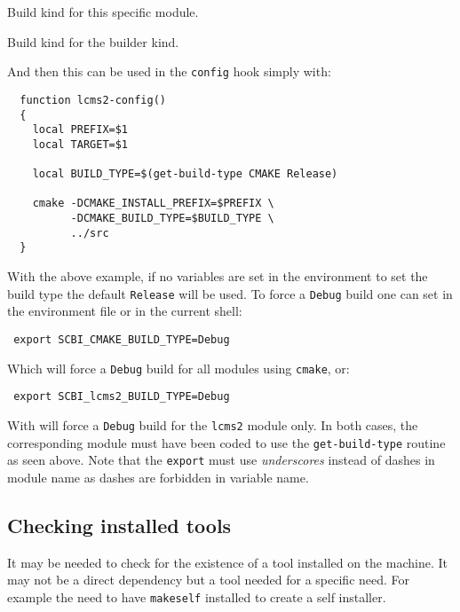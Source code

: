 \documentclass[a4paper,12pt,twoside]{article}
\newcommand{\code}[1]{\texttt{#1}}
\renewcommand{\emph}[1]{\textit{#1}}
\begin{document}
\begin{description}[style=nextline]
	\item [SCBI\_<module>\_BUILD\_TYPE] Build kind for this specific module.
	\item [SCBI\_<CONFIG>\_BUILD\_TYPE] Build kind for the builder kind.
\end{description}

And then this can be used in the \code{config} hook simply with:

\begin{lstlisting}
  function lcms2-config()
  {
    local PREFIX=$1
    local TARGET=$1

    local BUILD_TYPE=$(get-build-type CMAKE Release)

    cmake -DCMAKE_INSTALL_PREFIX=$PREFIX \
          -DCMAKE_BUILD_TYPE=$BUILD_TYPE \
          ../src
  }
\end{lstlisting}

With the above example, if no variables are set in the environment to set the build type the default \code{Release} will be used. To force a \code{Debug} build one can set in the environment file or in the current shell:

\begin{lstlisting}
 export SCBI_CMAKE_BUILD_TYPE=Debug
\end{lstlisting}

Which will force a \code{Debug} build for all modules using \code{cmake}, or:

\begin{lstlisting}
 export SCBI_lcms2_BUILD_TYPE=Debug
\end{lstlisting}

With will force a \code{Debug} build for the \code{lcms2} module only. In both cases, the corresponding module must have been coded to use the \code{get-build-type} routine as seen above. Note that the \code{export} must use \emph{underscores} instead of dashes in module name as dashes are forbidden in variable name.

\subsection{Checking installed tools}

It may be needed to check for the existence of a tool installed on the machine. It may not be a direct dependency but a tool needed for a specific need. For example the need to have \code{makeself} installed to create a self installer.
\end{document}
